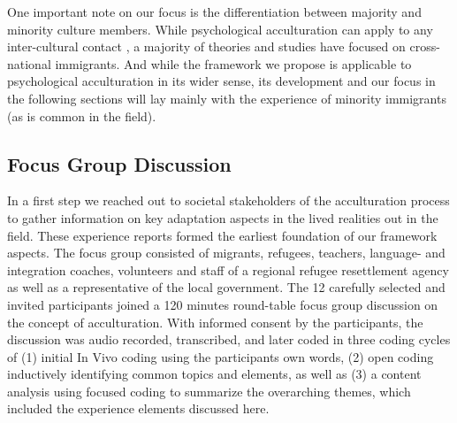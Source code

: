 \documentclass[nobib]{tufte-handout}
\begin{document}
One important note on our focus is the differentiation between majority and minority culture members. While psychological acculturation can apply to any inter-cultural contact \citep[including, for example, the contact between indigenous people and colonial settlers, e.g.,][]{Berry1974}, a majority of theories and studies have focused on cross-national immigrants. And while the framework we propose is applicable to psychological acculturation in its wider sense, its development and our focus in the following sections will lay mainly with the experience of minority immigrants (as is common in the field).

\subsection{Focus Group Discussion}
In a first step we reached out to societal stakeholders of the acculturation process to gather information on key adaptation aspects in the lived realities out in the field. These experience reports formed the earliest foundation of our framework aspects. The focus group consisted of migrants, refugees, teachers, language- and integration coaches, volunteers and staff of a regional refugee resettlement agency as well as a representative of the local government. The 12 carefully selected and invited participants joined a 120 minutes round-table focus group discussion on the concept of acculturation. With informed consent by the participants, the discussion was audio recorded, transcribed, and later coded in three coding cycles of (1) initial In Vivo coding using the participants own words, (2) open coding inductively identifying common topics and elements, as well as (3) a content analysis using focused coding to summarize the overarching themes, which included the experience elements discussed here.

\end{document}
